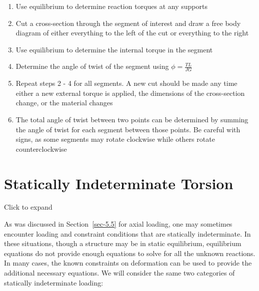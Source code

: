 \documentclass[
  letterpaper,
  DIV=11,
  numbers=noendperiod]{scrreprt}
\theoremstyle{definition}
\theoremstyle{remark}
\begin{document}
\begin{tcolorbox}[enhanced jigsaw, leftrule=.75mm, colbacktitle=quarto-callout-warning-color!10!white, breakable, opacityback=0, colback=white, titlerule=0mm, toprule=.15mm, colframe=quarto-callout-warning-color-frame, coltitle=black, title={Step-by-step: Angle of Twist}, toptitle=1mm, bottomrule=.15mm, rightrule=.15mm, left=2mm, arc=.35mm, opacitybacktitle=0.6, bottomtitle=1mm]

\begin{enumerate}
\def\labelenumi{\arabic{enumi}.}
\item
  Use equilibrium to determine reaction torques at any supports
\item
  Cut a cross-section through the segment of interest and draw a free
  body diagram of either everything to the left of the cut or everything
  to the right
\item
  Use equilibrium to determine the internal torque in the segment
\item
  Determine the angle of twist of the segment using
  \(\phi=\frac{TL}{JG}\)
\item
  Repeat steps 2 - 4 for all segments. A new cut should be made any time
  either a new external torque is applied, the dimensions of the
  cross-section change, or the material changes
\item
  The total angle of twist between two points can be determined by
  summing the angle of twist for each segment between those points. Be
  careful with signs, as some segments may rotate clockwise while others
  rotate counterclockwise
\end{enumerate}

\end{tcolorbox}

\section{Statically Indeterminate Torsion}\label{sec-6.3}

Click to expand

As was discussed in Section~\ref{sec-5.5} for axial loading, one may
sometimes encounter loading and constraint conditions that are
statically indeterminate. In these situations, though a structure may be
in static equilibrium, equilibrium equations do not provide enough
equations to solve for all the unknown reactions. In many cases, the
known constraints on deformation can be used to provide the additional
necessary equations. We will consider the same two categories of
statically indeterminate loading:
\end{document}
